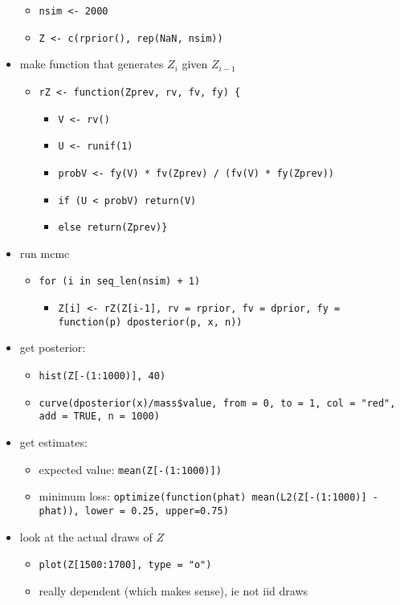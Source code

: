 \begin{itemize}
\begin{itemize}
\item \texttt{nsim <- 2000}
\item \texttt{Z <- c(rprior(), rep(NaN, nsim))}
\end{itemize}
\item make function that generates $Z_i$ given $Z_{i-1}$
\begin{itemize}
\item \texttt{rZ <- function(Zprev, rv, fv, fy) \{}
\begin{itemize}
\item \texttt{V <- rv()}
\item \texttt{U <- runif(1)}
\item \texttt{probV <- fy(V) * fv(Zprev) / (fv(V) * fy(Zprev))}
\item \texttt{if (U < probV) return(V)}
\item \texttt{else return(Zprev)\}}
\end{itemize}
\end{itemize}
\item run mcmc
\begin{itemize}
\item \texttt{for (i in seq\_len(nsim) + 1)}
\begin{itemize}
\item \texttt{Z[i] <- rZ(Z[i-1], rv = rprior, fv = dprior, fy = function(p) dposterior(p, x, n))}
\end{itemize}
\end{itemize}
\item get posterior:
\begin{itemize}
\item \texttt{hist(Z[-(1:1000)], 40)}
\item \texttt{curve(dposterior(x)/mass\$value, from = 0, to = 1, col = "red", add = TRUE, n = 1000)}
\end{itemize}
\item get estimates:
\begin{itemize}
\item expected value: \texttt{mean(Z[-(1:1000)])}
\item minimum loss: \texttt{optimize(function(phat) mean(L2(Z[-(1:1000)] - phat)), lower = 0.25, upper=0.75)}
\end{itemize}
\item look at the actual draws of $Z$
\begin{itemize}
\item \texttt{plot(Z[1500:1700], type = "o")}
\item really dependent (which makes sense), ie not iid draws

\end{itemize}
\end{itemize}
